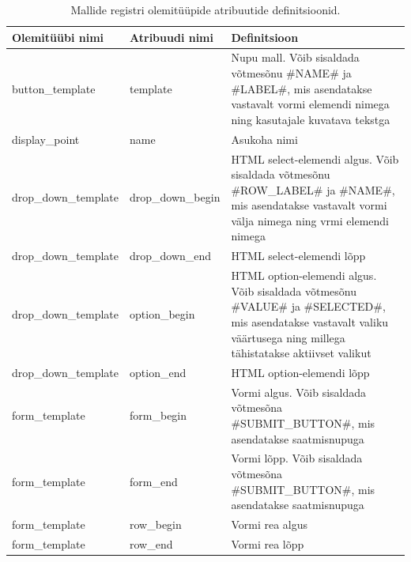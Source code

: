 \documentclass[a4paper,12pt]{article} %
\begin{document}
\begin{table}[H]
\centering
\caption{Mallide registri olemitüüpide atribuutide definitsioonid.}
\label{table_er_mallide_registri_olemitüüpide_atribuutide_definitsioonid}
\begin{tabular}{|p{3cm}|p{3cm}|p{9cm}|}
\hline
\rowcolor{rowgray}
Olemitüübi nimi & Atribuudi nimi & Definitsioon \\ \hline
button\_template & template & Nupu mall. Võib sisaldada võtmesõnu \#NAME\# ja \#LABEL\#, mis asendatakse vastavalt vormi elemendi nimega ning kasutajale kuvatava tekstga  \\ \hline
display\_point & name & Asukoha nimi \\ \hline
drop\_down\newline\_template & drop\_down\_begin & HTML select-elemendi algus. Võib sisaldada võtmesõnu \#ROW\_LABEL\# ja \#NAME\#, mis asendatakse vastavalt vormi välja nimega ning vrmi elemendi nimega \\ \hline
drop\_down\newline\_template & drop\_down\_end & HTML select-elemendi lõpp \\ \hline
drop\_down\newline\_template & option\_begin & HTML option-elemendi algus. Võib sisaldada võtmesõnu \#VALUE\# ja \#SELECTED\#, mis asendatakse vastavalt valiku väärtusega ning millega tähistatakse aktiivset valikut\\ \hline
drop\_down\newline\_template & option\_end & HTML option-elemendi lõpp \\ \hline
form\_template & form\_begin & Vormi algus. Võib sisaldada võtmesõna \#SUBMIT\_BUTTON\#, mis asendatakse saatmisnupuga \\ \hline
form\_template & form\_end & Vormi lõpp. Võib sisaldada võtmesõna \#SUBMIT\_BUTTON\#, mis asendatakse saatmisnupuga \\ \hline
form\_template & row\_begin & Vormi rea algus \\ \hline
form\_template & row\_end & Vormi rea lõpp \\ \hline
\end{tabular}
\end{table}
\end{document}
